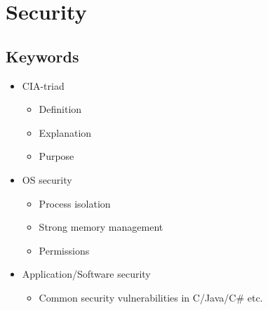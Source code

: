 \documentclass{report}
\begin{document}
\chapter{Security}

\section{Keywords}
\begin{itemize}
\item CIA-triad
\begin{itemize}
\item Definition
\item Explanation
\item Purpose
\end{itemize}
\item OS security
\begin{itemize}
\item Process isolation
\item Strong memory management
\item Permissions
\end{itemize}
\item Application/Software security
\begin{itemize}
\item Common security vulnerabilities in C/Java/C\# etc.
\end{itemize}
\end{itemize}
\newpage
\end{document}
